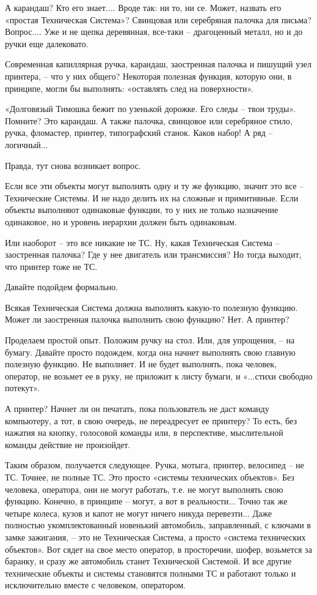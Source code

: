 \documentclass[11pt,a4paper]{article}
\begin{document}
А карандаш? Кто его знает.... Вроде так: ни то, ни се. Может, назвать его
«простая Техническая Система»? Свинцовая или серебряная палочка для письма?
Вопрос.... Уже и не щепка деревянная, все-таки – драгоценный металл, но и до
ручки еще далековато.

Современная капиллярная ручка, карандаш, заостренная палочка и пишущий узел
принтера, – что у них общего? Некоторая полезная функция, которую они, в
принципе, могли бы выполнять: «оставлять след на поверхности».

«Долговязый Тимошка бежит по узенькой дорожке. Его следы – твои
труды». Помните? Это карандаш. А также палочка, свинцовое или серебряное
стило, ручка, фломастер, принтер, типографский станок. Каков набор! А ряд –
логичный...

Правда, тут снова возникает вопрос. 

Если все эти объекты могут выполнять одну и ту же функцию, значит это все –
Технические Системы. И не надо делить их на сложные и примитивные. Если
объекты выполняют одинаковые функции, то у них не только назначение
одинаковое, но и уровень иерархии должен быть одинаковым.

Или наоборот – это все никакие не ТС. Ну, какая Техническая Система –
заостренная палочка? Где у нее двигатель или трансмиссия? Но тогда выходит,
что принтер тоже не ТС.

Давайте подойдем формально. 

Всякая Техническая Система должна выполнять какую-то полезную функцию. Может
ли заостренная палочка выполнить свою функцию? Нет. А принтер?

Проделаем простой опыт. Положим ручку на стол. Или, для упрощения, – на
бумагу. Давайте просто подождем, когда она начнет выполнять свою главную
полезную функцию. Не выполняет. И не будет выполнять, пока человек, оператор,
не возьмет ее в руку, не приложит к листу бумаги, и «...стихи свободно
потекут».

А принтер? Начнет ли он печатать, пока пользователь не даст команду
компьютеру, а тот, в свою очередь, не переадресует ее принтеру? То есть, без
нажатия на кнопку, голосовой команды или, в перспективе, мыслительной команды
действие не произойдет.

Таким образом, получается следующее. Ручка, мотыга, принтер, велосипед – не
ТС. Точнее, не полные ТС. Это просто «системы технических объектов». Без
человека, оператора, они не могут работать, т.е. не могут выполнять свою
функцию. Конечно, в принципе – могут, а вот в реальности... Точно так же
четыре колеса, кузов и капот не могут ничего никуда перевезти... Даже
полностью укомплектованный новенький автомобиль, заправленный, с ключами в
замке зажигания, – это не Техническая Система, а просто «система технических
объектов». Вот сядет на свое место оператор, в просторечии, шофер, возьмется
за баранку, и сразу же автомобиль станет Технической Системой. И все другие
технические объекты и системы становятся полными ТС и работают только и
исключительно вместе с человеком, оператором.
\end{document}
